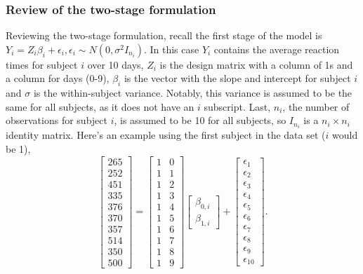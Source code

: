\documentclass[]{book}
\begin{document}
\subsubsection{Review of the two-stage
formulation}\label{review-of-the-two-stage-formulation}

Reviewing the two-stage formulation, recall the first stage of the model
is
\(Y_i = Z_i\beta_i + \epsilon_i, \epsilon_i\sim N(0, \sigma^2I_{n_i})\).
In this case \(Y_i\) contains the average reaction times for subject
\(i\) over 10 days, \(Z_i\) is the design matrix with a column of 1s and
a column for days (0-9), \(\beta_i\) is the vector with the slope and
intercept for subject \(i\) and \(\sigma\) is the within-subject
variance. Notably, this variance is assumed to be the same for all
subjects, as it does not have an \(i\) subscript. Last, \(n_i\), the
number of observations for subject \(i\), is assumed to be 10 for all
subjects, so \(I_{n_i}\) is a \(n_i\times n_i\) identity matrix. Here's
an example using the first subject in the data set (\(i\) would be 1),
\[\left[\begin{array}{c}265 \\ 252 \\ 451 \\ 335 \\ 376 \\370 \\ 357 \\ 514 \\ 350 \\ 500 \end{array}\right] = \left[\begin{array}{cc}
1 & 0 \\
1 & 1 \\
1 & 2 \\
1 & 3 \\
1 & 4 \\
1 & 5 \\
1 & 6 \\
1& 7 \\
1 & 8 \\
1 & 9 \end{array}\right]\left[\begin{array}{c}\beta_{0, i} \\ \beta_{1, i}  \end{array}\right] + 
\left[\begin{array}{c}
\epsilon_1 \\
\epsilon_2 \\
\epsilon_3 \\
\epsilon_4 \\
\epsilon_5 \\
\epsilon_6 \\
\epsilon_7 \\
\epsilon_8 \\
\epsilon_9 \\
\epsilon_{10} 
\end{array}\right].\]
\end{document}

